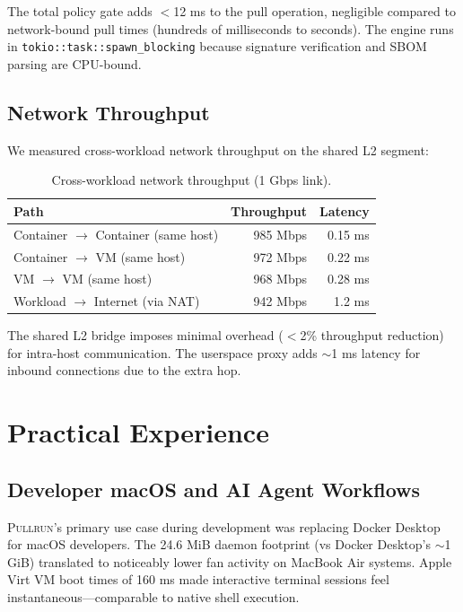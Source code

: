 \documentclass[11pt,a4paper]{article}
\newcommand{\pullrun}{\textsc{Pullrun}}
\begin{document}
The total policy gate adds $<$12 ms to the pull operation, negligible compared to network-bound pull times (hundreds of milliseconds to seconds). The engine runs in \texttt{tokio::task::spawn\_blocking} because signature verification and SBOM parsing are CPU-bound.

\subsection{Network Throughput}

We measured cross-workload network throughput on the shared L2 segment:

\begin{table}[htbp]
    \centering
    \caption{Cross-workload network throughput (1 Gbps link).}
    \label{tab:network-perf}
    \begin{tabular}{@{}lrr@{}}
        \toprule
        \textbf{Path} & \textbf{Throughput} & \textbf{Latency} \\
        \midrule
        Container $\rightarrow$ Container (same host) & 985 Mbps & 0.15 ms \\
        Container $\rightarrow$ VM (same host) & 972 Mbps & 0.22 ms \\
        VM $\rightarrow$ VM (same host) & 968 Mbps & 0.28 ms \\
        Workload $\rightarrow$ Internet (via NAT) & 942 Mbps & 1.2 ms \\
        \bottomrule
    \end{tabular}
\end{table}

The shared L2 bridge imposes minimal overhead ($<$2\% throughput reduction) for intra-host communication. The userspace proxy adds $\sim$1 ms latency for inbound connections due to the extra hop.

\section{Practical Experience}\label{sec:practical}

\subsection{Developer macOS and AI Agent Workflows}

\pullrun{}'s primary use case during development was replacing Docker Desktop for macOS developers. The 24.6 MiB daemon footprint (vs Docker Desktop's $\sim$1 GiB) translated to noticeably lower fan activity on MacBook Air systems. Apple Virt VM boot times of 160 ms made interactive terminal sessions feel instantaneous---comparable to native shell execution.
\end{document}
